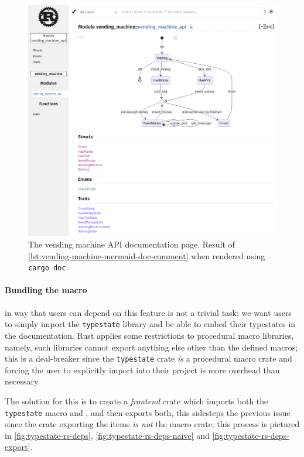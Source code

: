 \begin{figure}
    \centering
    \includegraphics[width=\textwidth]{Chapters/Figures/C4/vending-machine-rustdoc-mermaid.png}
    \caption{
        The vending machine \gls{API} documentation page.
        Result of \autoref{lst:vending-machine-mermaid-doc-comment} when rendered using \texttt{cargo doc}.
    }
    \label{fig:vending-machine-mermaid-docs}
\end{figure}

\paragraph{Bundling the macro} in way that users can depend on this feature is not a trivial task;
we want users to simply import the \texttt{typestate} library and be able to embed their typestates in the documentation.
Rust applies some restrictions to procedural macro libraries, namely,
such libraries cannot export anything else other than the defined macros;
this is a deal-breaker since the \texttt{typestate} crate \emph{is} a procedural macro crate and
forcing the user to explicitly import  into their project is more overhead than necessary.

The solution for this is to create a \emph{frontend} crate which imports both the \texttt{typestate} macro and ,
and then exports both, this sidesteps the previous issue since the crate exporting the items \emph{is not} the macro crate;
this process is pictured in \autoref{fig:typestate-rs-deps}, \autoref{fig:typestate-rs-deps-naive} and \autoref{fig:typestate-rs-deps-export}.

